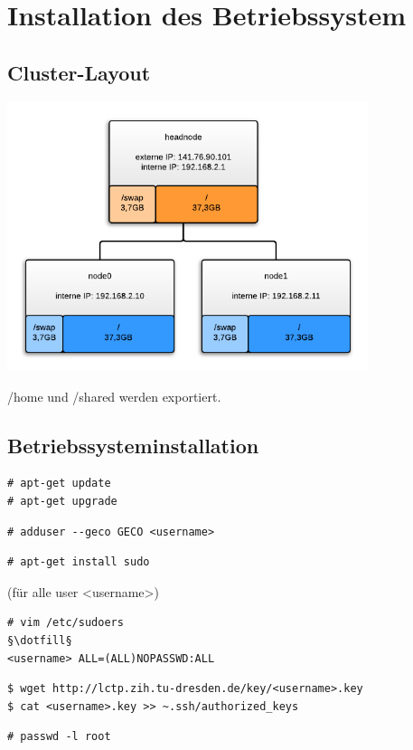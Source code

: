\chapter{Installation des Betriebssystem}
\section{Cluster-Layout}
\includegraphics[width=400px]{cluster_layout.png}

/home und /shared werden exportiert.
\section{Betriebssysteminstallation}
\begin{lstlisting}[style=Bash]
# apt-get update 
# apt-get upgrade 
\end{lstlisting}
\begin{lstlisting}[style=Bash]
# adduser --geco GECO <username>
\end{lstlisting}
\begin{lstlisting}[style=Bash]
# apt-get install sudo
\end{lstlisting}
(für alle user <username>)
\begin{lstlisting}[style=Bash]
# vim /etc/sudoers
§\dotfill§
<username> ALL=(ALL)NOPASSWD:ALL
\end{lstlisting}
\begin{lstlisting}[style=Bash]
$ wget http://lctp.zih.tu-dresden.de/key/<username>.key
$ cat <username>.key >> ~.ssh/authorized_keys
\end{lstlisting}
\begin{lstlisting}[style=Bash]
# passwd -l root 
\end{lstlisting}

